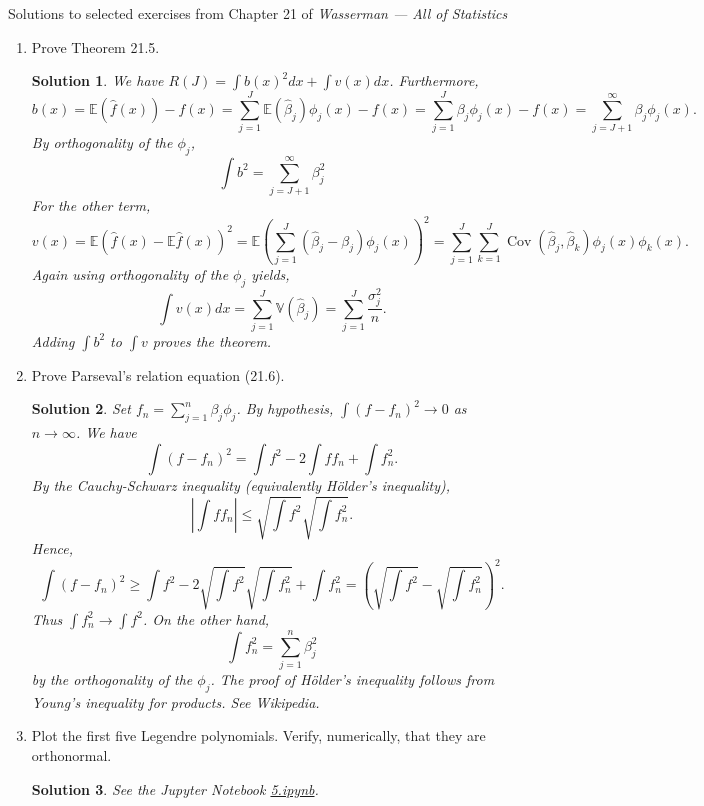 \documentclass[10pt]{article}
\newtheorem*{sol}{Solution}
\newcommand{\V}{\mathbb{V}}
\newcommand{\E}{\mathbb{E}}
\newcommand{\Cov}{\operatorname{Cov}}
\begin{document}
\noindent \large{Solutions to selected exercises from Chapter 21 of
\emph{Wasserman --- All of Statistics}}

\begin{enumerate}

\item[(1)] Prove Theorem 21.5.

\begin{sol}
We have $R(J) = \int b(x)^2dx + \int v(x)dx$. Furthermore,
\[
b(x) = \E(\hat f(x)) - f(x) = \sum_{j=1}^J \E(\hat \beta_j) \phi_j(x) - f(x)
= \sum_{j=1}^J \beta_j \phi_j(x) - f(x) = \sum_{j=J+1}^\infty \beta_j \phi_j(x).
\]
By orthogonality of the $\phi_j$,
\[
\int b^2 = \sum_{j=J+1}^\infty \beta_j^2
\]
For the other term,
\[
v(x) = \E\left(\hat f(x) - \E \hat f(x)\right)^2 =
\E \left( \sum_{j=1}^J (\hat \beta_j - \beta_j)\phi_j(x)\right)^2
= \sum_{j=1}^J \sum_{k=1}^J \Cov(\hat \beta_j, \hat \beta_k) \phi_j(x) \phi_k(x).
\]
Again using orthogonality of the $\phi_j$ yields,
\[
\int v(x) dx = \sum_{j=1}^J \V(\hat \beta_j) = \sum_{j=1}^J \frac{\sigma_j^2}{n}.
\]
Adding $\int b^2$ to $\int v$ proves the theorem.
\end{sol}

\item[(4)] Prove Parseval's relation equation (21.6).

\begin{sol}
Set $f_n = \sum_{j=1}^n \beta_j \phi_j$. By hypothesis,
$\int (f-f_n)^2\to 0$ as $n\to \infty$. We have
\[
    \int(f - f_n)^2 = \int f^2 - 2\int f f_n + \int f_n^2.
\]
By the Cauchy-Schwarz inequality (equivalently H\"{o}lder's inequality),
\[
\left|\int f f_n\right| \leq \sqrt{\int f^2} \sqrt{\int f_n^2}.
\]
Hence,
\[
    \int (f - f_n)^2 \geq \int f^2 - 2 \sqrt{\int f^2} \sqrt{\int f_n^2} +
    \int f_n^2 = \left(\sqrt{\int f^2} - \sqrt{\int f_n^2}\right)^2.
\]
Thus $\int f_n^2 \to \int f^2$. On the other hand,
\[
    \int f_n^2 = \sum_{j=1}^n \beta_j^2
\]
by the orthogonality of the $\phi_j$. The proof of H\"{o}lder's inequality
follows from Young's inequality for products. See Wikipedia.
\end{sol}

\item[(5)] Plot the first five Legendre polynomials. Verify, numerically, that they
are orthonormal.

\begin{sol}
See the Jupyter Notebook
\href{https://github.com/ajrasmus/some_of_statistics/blob/main/chapter_21/5.ipynb}{5.ipynb}.
\end{sol}


\end{enumerate}
\end{document}
